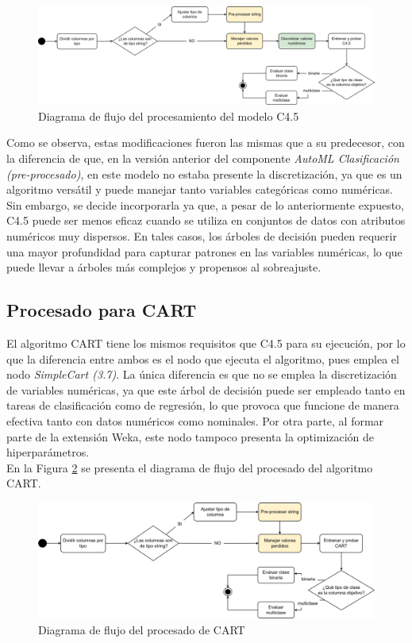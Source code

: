 \begin{figure}[h]
	\centering
	\includegraphics[width=1\linewidth]{"figuras/capi 2/modelos/procesado c4pt5.drawio"}
	\caption{Diagrama de flujo del procesamiento del modelo C4.5}
	\label{fig:procesado-c4pt5}
\end{figure}

Como se observa, estas modificaciones fueron las mismas que a su predecesor, con la diferencia de que, en la versión anterior del componente \textit{AutoML Clasificación (pre-procesado)}, en este modelo no estaba presente la discretización, ya que es un algoritmo versátil y puede manejar tanto variables categóricas como numéricas. Sin embargo, se decide incorporarla ya que, a pesar de lo anteriormente expuesto, C4.5 puede ser menos eficaz cuando se utiliza en conjuntos de datos con atributos numéricos muy dispersos. En tales casos, los árboles de decisión pueden requerir una mayor profundidad para capturar patrones en las variables numéricas, lo que puede llevar a árboles más complejos y propensos al sobreajuste. 

\subsection{Procesado para CART}
El algoritmo CART tiene los mismos requisitos que C4.5 para su ejecución, por lo que la diferencia entre ambos es el nodo que ejecuta el algoritmo, pues emplea el nodo \textit{SimpleCart (3.7)}. La única diferencia es que no se emplea la discretización de variables numéricas, ya que este árbol de decisión puede ser empleado tanto en tareas de clasificación como de regresión, lo que provoca que funcione de manera efectiva tanto con datos numéricos como nominales. Por otra parte, al formar parte de la extensión Weka, este nodo tampoco presenta la optimización de hiperparámetros. \\
En la Figura \ref{fig:procesado-cart} se presenta el diagrama de flujo del procesado del algoritmo CART.

\begin{figure}[H]
	\centering
	\includegraphics[width=1\linewidth]{"figuras/capi 2/modelos/procesado cart.drawio"}
	\caption{Diagrama de flujo del procesado de CART}
	\label{fig:procesado-cart}
\end{figure}


